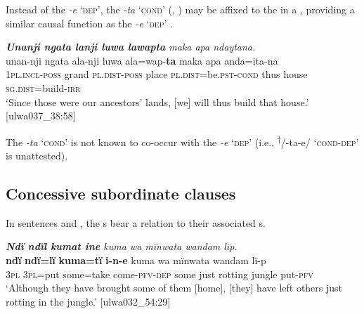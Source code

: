 Instead of the  \textit{-e} ‘\textsc{dep}’, the   \textit{-ta} ‘\textsc{cond}’ (, ) may be affixed to the  in a , providing a similar causal function as the  \textit{-e} ‘\textsc{dep}’ .

\ea%
    \label{ex:complex:49}
          \textit{\textbf{Unanji ngata lanji luwa lawapta} maka apa ndaytana.}\\
\gll    unan-nji    ngata   ala-nji luwa ala=wap-\textbf{ta}     maka  apa    anda=ita-na\\
    1\textsc{pl.incl-poss}  grand  \textsc{pl.dist-poss}  place  \textsc{pl.dist}=be.\textsc{pst-cond}    thus  house  \textsc{sg.dist}=build-\textsc{irr}\\
\glt `Since those were our ancestors’ lands, [we] will thus build that house.’ [ulwa037\_38:58]
\z

The   \textit{-ta} ‘\textsc{cond}’ is not known to co-occur with the  \textit{-e} ‘\textsc{dep}’ (i.e., \textsuperscript{†}/-ta-e/ ‘\textsc{cond-dep}’ is unattested).


\subsection{Concessive subordinate clauses}\label{sec:12.2.3}


In sentences  and , the s bear a  relation to their associated s.

\ea%
    \label{ex:complex:50}
          \textit{\textbf{Ndï ndïl kumat ine} kuma wa mïnwata wandam lïp.}\\
\gll    \textbf{ndï}     \textbf{ndï=lï}    \textbf{kuma=tï}   \textbf{i-n-e}        kuma  wa mïnwata  wandam  lï-p\\
    3\textsc{pl}    3\textsc{pl=}put  some=take   come-\textsc{pfv-dep}    some  just    rotting    jungle    put-\textsc{pfv}\\
\glt `Although they have brought some of them [home], [they] have left others just rotting in the jungle.’ [ulwa032\_54:29]
\z

